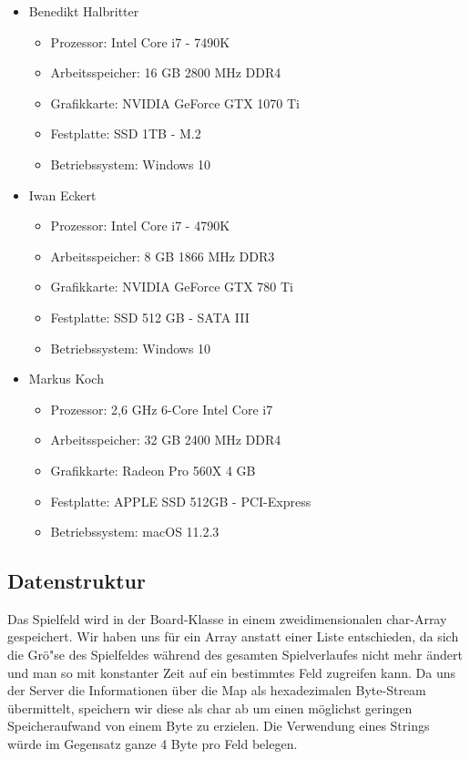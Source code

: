 \newpage

\begin{itemize}
    \item Benedikt Halbritter
    \begin{itemize}
        \item Prozessor: Intel Core i7 - 7490K
        \item Arbeitsspeicher: 16 GB 2800 MHz DDR4
        \item Grafikkarte: NVIDIA GeForce GTX 1070 Ti
        \item Festplatte: SSD 1TB - M.2
        \item Betriebssystem: Windows 10
    \end{itemize}
    \item Iwan Eckert
    \begin{itemize}
        \item Prozessor: Intel Core i7 - 4790K
        \item Arbeitsspeicher: 8 GB 1866 MHz DDR3
        \item Grafikkarte: NVIDIA GeForce GTX 780 Ti
        \item Festplatte: SSD 512 GB - SATA III
        \item Betriebssystem: Windows 10
    \end{itemize}
    \item Markus Koch
    \begin{itemize}
        \item Prozessor: 2,6 GHz 6-Core Intel Core i7
        \item Arbeitsspeicher: 32 GB 2400 MHz DDR4
        \item Grafikkarte: Radeon Pro 560X 4 GB
        \item Festplatte: APPLE SSD 512GB - PCI-Express
        \item Betriebssystem: macOS 11.2.3
    \end{itemize}
\end{itemize}

\newpage

\subsection{Datenstruktur}\label{subsec:datenstruktur}
Das Spielfeld wird in der Board-Klasse in einem zweidimensionalen char-Array gespeichert.
Wir haben uns f\"ur ein Array anstatt einer Liste entschieden, da sich die Gr\"o"se des Spielfeldes w\"ahrend des gesamten Spielverlaufes nicht mehr \"andert und man so mit konstanter Zeit auf ein bestimmtes Feld zugreifen kann.
Da uns der Server die Informationen \"uber die Map als hexadezimalen Byte-Stream \"ubermittelt, speichern wir diese als char ab um einen m\"oglichst geringen Speicheraufwand von einem Byte zu erzielen.
Die Verwendung eines Strings w\"urde im Gegensatz ganze 4 Byte pro Feld belegen.

